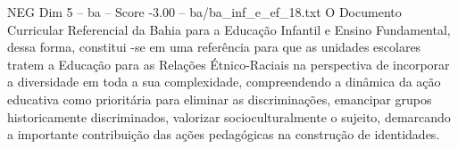 \begin{textsample}{NEG Dim 5 – ba – Score -3.00 – ba/ba\_inf\_e\_ef\_18.txt}
O Documento Curricular Referencial da Bahia para a Educação Infantil e Ensino Fundamental, dessa forma, constitui -se em uma referência para que as unidades escolares tratem a Educação para as Relações Étnico-Raciais na perspectiva de incorporar a diversidade em toda a sua complexidade, compreendendo a dinâmica da ação educativa como prioritária para eliminar as discriminações, emancipar grupos historicamente discriminados, valorizar socioculturalmente o sujeito, demarcando a importante contribuição das ações pedagógicas na construção de identidades.

\end{textsample}
